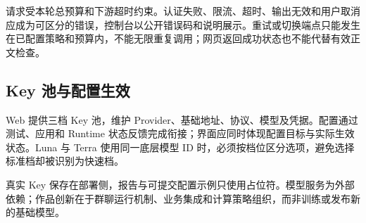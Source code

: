 请求受本轮总预算和下游超时约束。认证失败、限流、超时、输出无效和用户取消应成为可区分的错误，控制台以公开错误码和说明展示。重试或切换端点只能发生在已配置策略和预算内，不能无限重复调用；网页返回成功状态也不能代替有效正文检查。

\subsection{Key 池与配置生效}
Web 提供三档 Key 池，维护 Provider、基础地址、协议、模型及凭据。配置通过测试、应用和 Runtime 状态反馈完成衔接；界面应同时体现配置目标与实际生效状态。Luna 与 Terra 使用同一底层模型 ID 时，必须按档位区分选项，避免选择标准档却被识别为快速档。

真实 Key 保存在部署侧，报告与可提交配置示例只使用占位符。模型服务为外部依赖；作品创新在于群聊运行机制、业务集成和计算策略组织，而非训练或发布新的基础模型。
